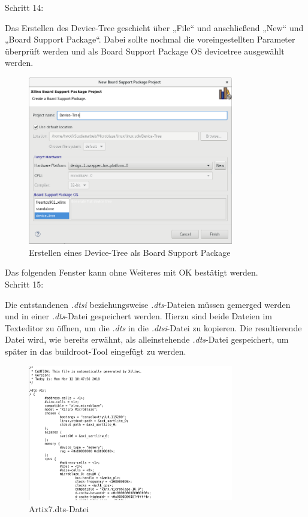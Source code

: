 Schritt 14:

Das Erstellen des Device-Tree geschieht über „File“ und anschließend „New“ und „Board Support Package“.
Dabei sollte nochmal die voreingestellten Parameter überprüft werden und als Board Support Package OS
devicetree ausgewählt werden.

\begin{figure}[H]
\centering
\includegraphics[width=0.8\textwidth]{Hauptteil/Schritt14.png}
\caption{Erstellen eines Device-Tree als Board Support Package}
\label{fig:mbschritt14}
\end{figure}

Das folgenden Fenster kann ohne Weiteres mit OK bestätigt werden.\\


Schritt 15:

Die entstandenen \emph{.dtsi} beziehungsweise \emph{.dts}-Dateien müssen gemerged werden und in einer \emph{.dts}-Datei gespeichert werden.
Hierzu sind beide Dateien im Texteditor zu öffnen, um die \emph{.dts}
 in die \emph{.dtsi}-Datei zu kopieren.
 Die resultierende Datei wird, wie bereits erwähnt, als alleinstehende \emph{.dts}-Datei gespeichert, um später in das buildroot-Tool eingefügt zu werden.

\begin{figure}[H]
\centering
\includegraphics[width=0.8\textwidth]{Hauptteil/Schritt15.png}
\caption{Artix7.dts-Datei}
\label{fig:mbschritt15}
\end{figure}

